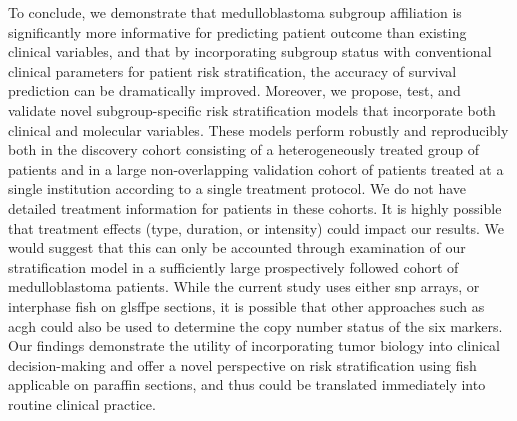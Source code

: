 To conclude, we demonstrate that medulloblastoma subgroup affiliation is significantly more informative for predicting patient outcome than existing clinical variables, and that by incorporating subgroup status with conventional clinical parameters for patient risk stratification, the accuracy of survival prediction can be dramatically improved.  Moreover, we propose, test, and validate novel subgroup-specific risk stratification models that incorporate both clinical and molecular variables.  These models perform robustly and reproducibly both in the discovery cohort consisting of a heterogeneously treated group of patients and in a large non-overlapping validation cohort of patients treated at a single institution according to a single treatment protocol.  We do not have detailed treatment information for patients in these cohorts.  It is highly possible that treatment effects (type, duration, or intensity) could impact our results.  We would suggest that this can only be accounted through examination of our stratification model in a sufficiently large prospectively followed cohort of medulloblastoma patients.  While the current study uses either \gls{snp} arrays, or interphase \gls{fish} on gls{ffpe} sections, it is possible that other approaches such as \gls{acgh} could also be used to determine the copy number status of the six markers.  Our findings demonstrate the utility of incorporating tumor biology into clinical decision-making and offer a novel perspective on risk stratification using \gls{fish} applicable on paraffin sections, and thus could be translated immediately into routine clinical practice.







